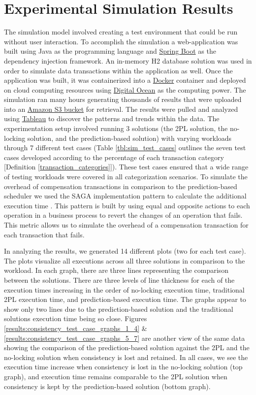 \section{Experimental Simulation Results}
\label{sec:experimentation}
The simulation model involved creating a test environment that could be run without user interaction. To accomplish the simulation a web-application was built using Java as the programming language and \href{https://spring.io/projects/spring-boot}{Spring Boot} as the dependency injection framework. An in-memory H2 database solution was used in order to simulate data transactions within the application as well. Once the application was built, it was containerized into a \href{https://www.docker.com/}{Docker} container and deployed on cloud computing resources using \href{https://www.digitalocean.com/}{Digital Ocean} as the computing power. The simulation ran many hours generating thousands of results that were uploaded into an \href{https://aws.amazon.com/s3/}{Amazon S3 bucket} for retrieval. The results were pulled and analyzed using \href{https://www.tableau.com/}{Tableau} to discover the patterns and trends within the data. The experimentation setup involved running 3 solutions (the 2PL solution, the no-locking solution, and the prediction-based solution) with varying workloads through 7 different test cases (Table \ref{tbl:sim_test_cases} outlines the seven test cases developed according to the percentage of each transaction category [Definition \ref{transaction_categories}]). These test cases ensured that a wide range of testing workloads were covered in all categorization scenarios. To simulate the overhead of compensation transactions in comparison to the prediction-based scheduler we used the SAGA implementation pattern to calculate the additional execution time \cite{SAGAS-Garcaa-Molrna}. This pattern is built by using equal and opposite actions to each operation in a business process to revert the changes of an operation that fails. This metric allows us to simulate the overhead of a compensation transaction for each transaction that fails.

In analyzing the results, we generated 14 different plots (two for each test case). The plots visualize all executions across all three solutions in comparison to the workload. In each graph, there are three lines representing the comparison between the solutions. There are three levels of line thickness for each of the execution times increasing in the order of no-locking execution time, traditional 2PL execution time, and prediction-based execution time. The graphs appear to show only two lines due to the prediction-based solution and the traditional solutions execution time being so close. Figures \ref{results:consistency_test_case_graphs_1_4} \& \ref{results:consistency_test_case_graphs_5_7} are another view of the same data showing the comparison of the prediction-based solution against the 2PL and the no-locking solution when consistency is lost and retained. In all cases, we see the execution time increase when consistency is lost in the no-locking solution (top graph), and execution time remains comparable to the 2PL solution when consistency is kept by the prediction-based solution (bottom graph).

